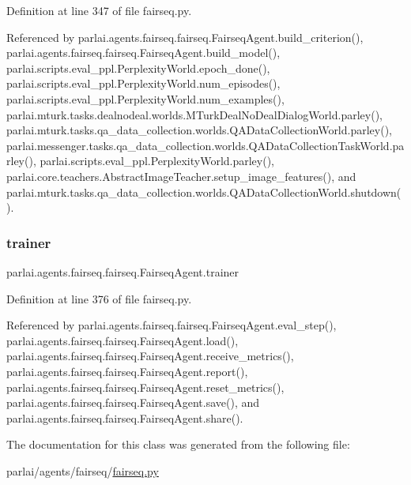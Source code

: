 Definition at line 347 of file fairseq.\+py.



Referenced by parlai.\+agents.\+fairseq.\+fairseq.\+Fairseq\+Agent.\+build\+\_\+criterion(), parlai.\+agents.\+fairseq.\+fairseq.\+Fairseq\+Agent.\+build\+\_\+model(), parlai.\+scripts.\+eval\+\_\+ppl.\+Perplexity\+World.\+epoch\+\_\+done(), parlai.\+scripts.\+eval\+\_\+ppl.\+Perplexity\+World.\+num\+\_\+episodes(), parlai.\+scripts.\+eval\+\_\+ppl.\+Perplexity\+World.\+num\+\_\+examples(), parlai.\+mturk.\+tasks.\+dealnodeal.\+worlds.\+M\+Turk\+Deal\+No\+Deal\+Dialog\+World.\+parley(), parlai.\+mturk.\+tasks.\+qa\+\_\+data\+\_\+collection.\+worlds.\+Q\+A\+Data\+Collection\+World.\+parley(), parlai.\+messenger.\+tasks.\+qa\+\_\+data\+\_\+collection.\+worlds.\+Q\+A\+Data\+Collection\+Task\+World.\+parley(), parlai.\+scripts.\+eval\+\_\+ppl.\+Perplexity\+World.\+parley(), parlai.\+core.\+teachers.\+Abstract\+Image\+Teacher.\+setup\+\_\+image\+\_\+features(), and parlai.\+mturk.\+tasks.\+qa\+\_\+data\+\_\+collection.\+worlds.\+Q\+A\+Data\+Collection\+World.\+shutdown().

\mbox{\label{classparlai_1_1agents_1_1fairseq_1_1fairseq_1_1FairseqAgent_a8da014b113d3c65ed6c3238dcf2631f1}} 
\subsubsection{\texorpdfstring{trainer}{trainer}}
{\footnotesize\ttfamily parlai.\+agents.\+fairseq.\+fairseq.\+Fairseq\+Agent.\+trainer}



Definition at line 376 of file fairseq.\+py.



Referenced by parlai.\+agents.\+fairseq.\+fairseq.\+Fairseq\+Agent.\+eval\+\_\+step(), parlai.\+agents.\+fairseq.\+fairseq.\+Fairseq\+Agent.\+load(), parlai.\+agents.\+fairseq.\+fairseq.\+Fairseq\+Agent.\+receive\+\_\+metrics(), parlai.\+agents.\+fairseq.\+fairseq.\+Fairseq\+Agent.\+report(), parlai.\+agents.\+fairseq.\+fairseq.\+Fairseq\+Agent.\+reset\+\_\+metrics(), parlai.\+agents.\+fairseq.\+fairseq.\+Fairseq\+Agent.\+save(), and parlai.\+agents.\+fairseq.\+fairseq.\+Fairseq\+Agent.\+share().



The documentation for this class was generated from the following file\+:\begin{DoxyCompactItemize}
\item 
parlai/agents/fairseq/\hyperlink{fairseq_8py}{fairseq.\+py}\end{DoxyCompactItemize}
